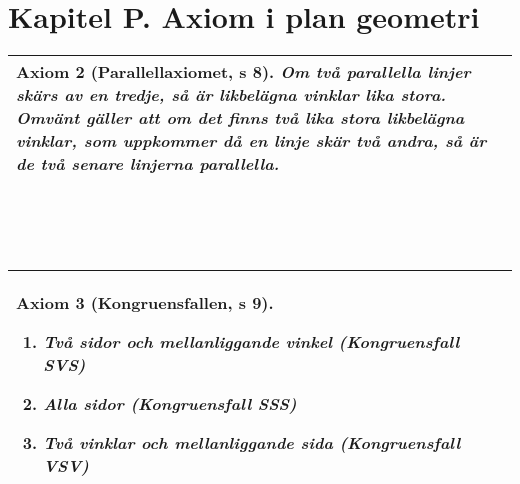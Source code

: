 \documentclass[a4paper]{article}
\begin{document}
\section*{Kapitel P. Axiom i plan geometri}
\begin{tabular}{|L{11.5cm}|} \hline
\textbf{Axiom 2} (Parallellaxiomet, s 8).
\textit{Om två parallella linjer skärs av en tredje, så är likbelägna vinklar lika stora. Omvänt gäller att om det finns två lika stora likbelägna vinklar, som uppkommer då en linje skär två andra, så är de två senare linjerna parallella.}
\vspace{0.2cm}
\\\hline
\end{tabular}
\\\\\\
\begin{tabular}{|L{11.5cm}|} \hline
\textbf{Axiom 3} (Kongruensfallen, s 9).
\begin{enumerate}
\item \textit{Två sidor och mellanliggande vinkel (Kongruensfall SVS)}
\item \textit{Alla sidor (Kongruensfall SSS)}
\item \textit{Två vinklar och mellanliggande sida (Kongruensfall VSV)}
\end{enumerate}
\vspace{0.2cm}
\\\hline
\end{tabular}
\end{document}
